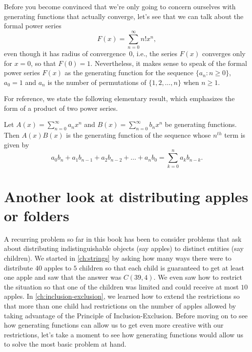 Before you become convinced that we're only going to concern ourselves
with generating functions that actually converge, let's see that we
can talk about the formal power series
\[
F(x)=\sum_{n=0}^{\infty} n! x^n,
\]
even though it has radius of convergence~$0$, i.e., the series $F(x)$
converges only for $x=0$, so that $F(0)=1$.  Nevertheless, it makes
sense to speak of the formal power series $F(x)$ as the generating
function for the sequence $\{a_n:n\ge0\}$, $a_0=1$ and  $a_n$ is the number
of permutations of $\{1,2,\dots,n\}$ when $n\ge1$.

For reference, we state the following elementary result, which
emphasizes the form of a product of two power series.

\begin{proposition}\label{prop:genfunction-product}
Let $A(x)=\sum_{n=0}^\infty a_nx^n$ and
$B(x)=\sum_{n=0}^\infty b_nx^n$ be generating functions.  Then
$A(x)B(x)$ is the generating function of the sequence whose $n^{th}$ term
is given by
\[
a_0b_n+a_1b_{n-1}+a_2b_{n-2}+\dots+a_nb_0=\sum_{k=0}^n a_kb_{n-k}.
\]
\end{proposition}


\section{Another look at distributing apples or folders}\label{s:genfunction:distributions}

A recurring problem so far in this book has been to consider problems
that ask about distributing indistinguishable objects (say apples) to
distinct entities (say children). We started in \autoref{ch:strings}
by asking how many ways there were to distribute $40$ apples to $5$
children so that each child is guaranteed to get at least one apple
and saw that the answer was $C(39,4)$. We even saw how to restrict the
situation so that one of the children was limited and could receive at
most $10$ apples. In \autoref{ch:inclusion-exclusion}, we learned how
to extend the restrictions so that more than one child had
restrictions on the number of apples allowed by taking advantage of
the Principle of Inclusion-Exclusion. Before moving on to see how
generating functions can allow us to get even more creative with our
restrictions, let's take a moment to see how generating functions
would allow us to solve the most basic problem at hand.

